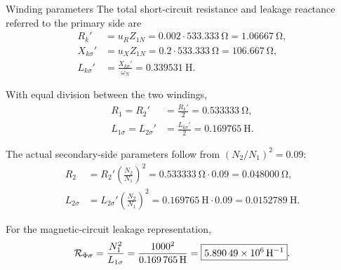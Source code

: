 \begin{formulaBox}{Winding parameters}
	The total short-circuit resistance and leakage reactance referred to the
	primary side are
	\begin{align}
		R_k'&=u_R Z_{1N}
		=0.002\cdot\SI{533.333}{\ohm}
		=\SI{1.06667}{\ohm},\\
		X_{k\sigma}'&=u_X Z_{1N}
		=0.2\cdot\SI{533.333}{\ohm}
		=\SI{106.667}{\ohm},\\
		L_{k\sigma}'&=\frac{X_{k\sigma}'}{\omega_N}
		=\SI{0.339531}{\henry}.
	\end{align}
	
	With equal division between the two windings,
	\begin{align}
		R_1=R_2'
		&=\frac{R_k'}{2}
		=\boxed{\SI{0.533333}{\ohm}},\\
		L_{1\sigma}=L_{2\sigma}'
		&=\frac{L_{k\sigma}'}{2}
		=\boxed{\SI{0.169765}{\henry}}.
	\end{align}
	
	The actual secondary-side parameters follow from
	$(N_2/N_1)^2=0.09$:
	\begin{align}
		R_2&=R_2'\left(\frac{N_2}{N_1}\right)^2
		=\SI{0.533333}{\ohm}\cdot0.09
		=\boxed{\SI{0.048000}{\ohm}},\\
		L_{2\sigma}&=L_{2\sigma}'\left(\frac{N_2}{N_1}\right)^2
		=\SI{0.169765}{\henry}\cdot0.09
		=\boxed{\SI{0.0152789}{\henry}}.
	\end{align}
	
	For the magnetic-circuit leakage representation,
	\begin{equation}
		\Rmag_{\Phi\sigma}
		=\frac{N_1^2}{L_{1\sigma}}
		=\frac{1000^2}{\SI{0.169765}{\henry}}
		=\boxed{\SI{5.89049e6}{\per\henry}}.
	\end{equation}
\end{formulaBox}

